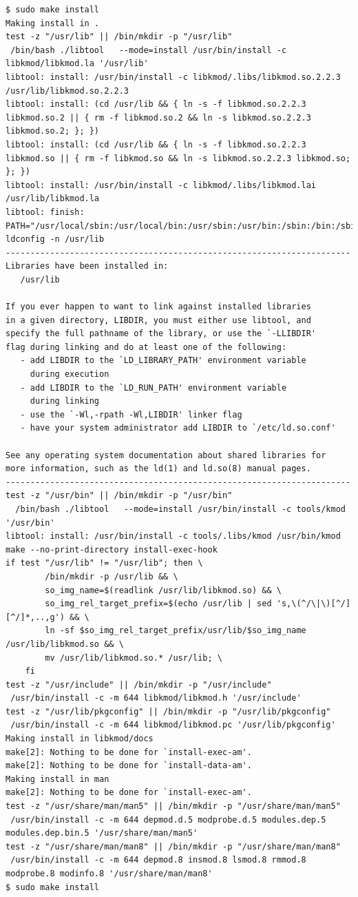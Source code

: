 \documentclass[11pt,a4paper]{article}
\begin{document}
{\begin{shaded}\begin{verbatim}
$ sudo make install
Making install in .
test -z "/usr/lib" || /bin/mkdir -p "/usr/lib"
 /bin/bash ./libtool   --mode=install /usr/bin/install -c   libkmod/libkmod.la '/usr/lib'
libtool: install: /usr/bin/install -c libkmod/.libs/libkmod.so.2.2.3 /usr/lib/libkmod.so.2.2.3
libtool: install: (cd /usr/lib && { ln -s -f libkmod.so.2.2.3 libkmod.so.2 || { rm -f libkmod.so.2 && ln -s libkmod.so.2.2.3 libkmod.so.2; }; })
libtool: install: (cd /usr/lib && { ln -s -f libkmod.so.2.2.3 libkmod.so || { rm -f libkmod.so && ln -s libkmod.so.2.2.3 libkmod.so; }; })
libtool: install: /usr/bin/install -c libkmod/.libs/libkmod.lai /usr/lib/libkmod.la
libtool: finish: PATH="/usr/local/sbin:/usr/local/bin:/usr/sbin:/usr/bin:/sbin:/bin:/sbin" ldconfig -n /usr/lib
----------------------------------------------------------------------
Libraries have been installed in:
   /usr/lib

If you ever happen to want to link against installed libraries
in a given directory, LIBDIR, you must either use libtool, and
specify the full pathname of the library, or use the `-LLIBDIR'
flag during linking and do at least one of the following:
   - add LIBDIR to the `LD_LIBRARY_PATH' environment variable
     during execution
   - add LIBDIR to the `LD_RUN_PATH' environment variable
     during linking
   - use the `-Wl,-rpath -Wl,LIBDIR' linker flag
   - have your system administrator add LIBDIR to `/etc/ld.so.conf'

See any operating system documentation about shared libraries for
more information, such as the ld(1) and ld.so(8) manual pages.
----------------------------------------------------------------------
test -z "/usr/bin" || /bin/mkdir -p "/usr/bin"
  /bin/bash ./libtool   --mode=install /usr/bin/install -c tools/kmod '/usr/bin'
libtool: install: /usr/bin/install -c tools/.libs/kmod /usr/bin/kmod
make --no-print-directory install-exec-hook
if test "/usr/lib" != "/usr/lib"; then \
        /bin/mkdir -p /usr/lib && \
        so_img_name=$(readlink /usr/lib/libkmod.so) && \
        so_img_rel_target_prefix=$(echo /usr/lib | sed 's,\(^/\|\)[^/][^/]*,..,g') && \
        ln -sf $so_img_rel_target_prefix/usr/lib/$so_img_name /usr/lib/libkmod.so && \
        mv /usr/lib/libkmod.so.* /usr/lib; \
    fi
test -z "/usr/include" || /bin/mkdir -p "/usr/include"
 /usr/bin/install -c -m 644 libkmod/libkmod.h '/usr/include'
test -z "/usr/lib/pkgconfig" || /bin/mkdir -p "/usr/lib/pkgconfig"
 /usr/bin/install -c -m 644 libkmod/libkmod.pc '/usr/lib/pkgconfig'
Making install in libkmod/docs
make[2]: Nothing to be done for `install-exec-am'.
make[2]: Nothing to be done for `install-data-am'.
Making install in man
make[2]: Nothing to be done for `install-exec-am'.
test -z "/usr/share/man/man5" || /bin/mkdir -p "/usr/share/man/man5"
 /usr/bin/install -c -m 644 depmod.d.5 modprobe.d.5 modules.dep.5 modules.dep.bin.5 '/usr/share/man/man5'
test -z "/usr/share/man/man8" || /bin/mkdir -p "/usr/share/man/man8"
 /usr/bin/install -c -m 644 depmod.8 insmod.8 lsmod.8 rmmod.8 modprobe.8 modinfo.8 '/usr/share/man/man8'
$ sudo make install
\end{verbatim}\end{shaded}}
\end{document}
